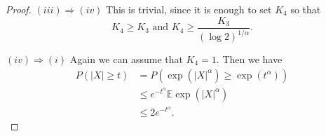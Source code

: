 \documentclass[a4paper]{article}
\newcommand*{\E}{\mathbb{E}}
\begin{document}
\begin{proof}
  $(iii) \Rightarrow (iv)$
  This is trivial, since it is enough to set $K_4$ so that 
  \[
    K_4 \ge K_3 \text{ and }K_4 \ge \frac{K_3}{(\log 2)^{1/\alpha}}.
  \]

  $(iv) \Rightarrow (i)$
  Again we can assume that $K_4 = 1$. Then we have
  \begin{align*}
    P(|X| \ge t) 
    &= P\left( \exp(|X|^\alpha) \ge \exp(t^\alpha) \right)
    \\
    &\le e^{-t^\alpha} \E \exp(|X|^\alpha)
    \\
    &\le 2e^{-t^\alpha}.
  \end{align*}
\end{proof}
\end{document}
